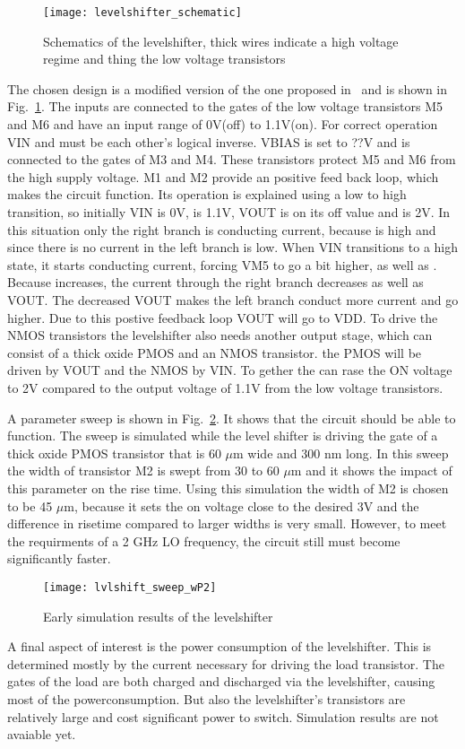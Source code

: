 \begin{figure}[h]
 \texttt{[image: levelshifter\_schematic]}
 \caption{Schematics of the levelshifter, thick wires indicate a high voltage regime and thing the low voltage transistors}
 \label{fig:schematic_levelshifter}
\end{figure}
The chosen design is a modified version of the one proposed in~\cite{powerdac} and is shown in Fig.~\ref{fig:schematic_levelshifter}. The inputs are connected to the gates of the low voltage transistors M5 and M6 and have an input range of 0V(off) to 1.1V(on). For correct operation VIN and  must be each other's logical inverse. VBIAS is set to ??V and is connected to the gates of M3 and M4. These transistors protect M5 and M6 from the high supply voltage. M1 and M2 provide an positive feed back loop, which makes the circuit function. Its operation is explained using a low to high transition, so initially VIN is 0V,  is 1.1V, VOUT is on its off value and  is 2V. In this situation only the right branch is conducting current, because  is high and since there is no current in the left branch  is low. When VIN transitions to a high state, it starts conducting current, forcing VM5 to go a bit higher, as well as . Because  increases, the current through the right branch decreases as well as VOUT. The decreased VOUT makes the left branch conduct more current and  go higher. Due to this postive feedback loop VOUT will go to VDD. To drive the NMOS transistors the levelshifter also needs another output stage, which can consist of a thick oxide PMOS and an NMOS transistor. the PMOS will be driven by VOUT and the NMOS by VIN. To gether the can rase the ON voltage to 2V compared to the output voltage of 1.1V from the low voltage transistors. 

A parameter sweep is shown in Fig.~\ref{fig:levelshifter_sweep}. It shows that the circuit should be able to function. The sweep is simulated while the level shifter is driving the gate of a thick oxide PMOS transistor that is 60 $\mu$m wide and 300 nm long. In this sweep the width of transistor M2 is swept from 30 to 60 $\mu$m and it shows the impact of this parameter on the rise time. Using this simulation the width of M2 is chosen to be 45 $\mu$m, because it sets the on voltage close to the desired 3V and the difference in risetime compared to larger widths is very small. However, to meet the requirments of a 2 GHz LO frequency, the circuit still must become significantly faster.
\begin{figure}[h]
 \texttt{[image: lvlshift\_sweep\_wP2]}
 \caption{Early simulation results of the levelshifter}
 \label{fig:levelshifter_sweep}
\end{figure}

A final aspect of interest is the power consumption of the levelshifter. This is determined mostly by the current necessary for driving the load transistor. The gates of the load are both charged and discharged via the levelshifter, causing most of the powerconsumption. But also the levelshifter's transistors are relatively large and cost significant power to switch. Simulation results are not avaiable yet. 
